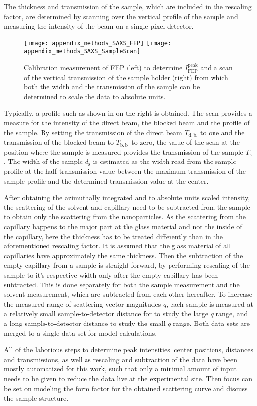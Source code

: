 \documentclass[\main/dresen_thesis.tex]{subfiles}
\begin{document}
    The thickness and transmission of the sample, which are included in the rescaling factor, are determined by scanning over the vertical profile of the sample and measuring the intensity of the beam on a single-pixel detector.
    \begin{figure}[tb]
      \centering
      \texttt{[image: appendix\_methods\_SAXS\_FEP]}
      \texttt{[image: appendix\_methods\_SAXS\_SampleScan]}
      \caption{\label{fig:methods:saxs:fep_scan}Calibration measurement of FEP (left) to determine $I_\mathrm{FEP}^\mathrm{peak}$ and a scan of the vertical transmission of the sample holder (right) from which both the width and the transmission of the sample can be determined to scale the data to absolute units.}
    \end{figure}
    Typically, a profile such as shown in  on the right is obtained.
    The scan provides a measure for the intensity of the direct beam, the blocked beam and the profile of the sample.
    By setting the transmission of the direct beam $T_\mathrm{d.\,b.}$ to one and the transmission of the blocked beam to $T_\mathrm{b.\,b.}$ to zero, the value of the scan at the position where the sample is measured provides the transmission of the sample $T_\mathrm{s}$.
    The width of the sample $d_\mathrm{s}$ is estimated as the width read from the sample profile at the half transmission value between the maximum transmission of the sample profile and the determined transmission value at the center.

    After obtaining the azimuthally integrated and to absolute units scaled intensity, the scattering of the solvent and capillary need to be subtracted from the sample to obtain only the scattering from the nanoparticles.
    As the scattering from the capillary happens to the major part at the glass material and not the inside of the capillary, here the thickness has to be treated differently than in the aforementioned rescaling factor.
    It is assumed that the glass material of all capillaries have approximately the same thickness.
    Then the subtraction of the empty capillary from a sample is straight forward, by performing rescaling of the sample to it's respective width only after the empty capillary has been subtracted.
    This is done separately for both the sample measurement and the solvent measurement, which are subtracted from each other hereafter.
    To increase the measured range of scattering vector magnitudes $q$, each sample is measured at a relatively small sample-to-detector distance for to study the large $q$ range, and a long sample-to-detector distance to study the small $q$ range.
    Both data sets are merged to a single data set for model calculations.

    All of the laborious steps to determine peak intensities, center positions, distances and transmissions, as well as rescaling and subtraction of the data have been mostly automatized for this work, such that only a minimal amount of input needs to be given to reduce the data live at the experimental site.
    Then focus can be set on modeling the form factor for the obtained scattering curve and discuss the sample structure.
\end{document}
